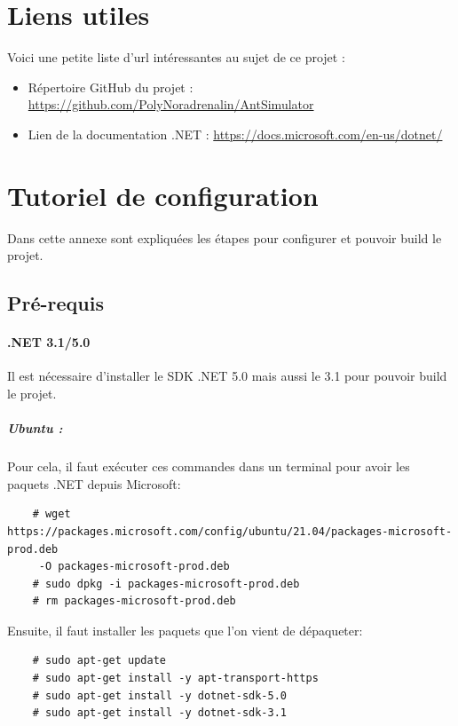 \documentclass{EPUProjetDi}
\begin{document}
\chapter{Liens utiles}
Voici une petite liste d'url intéressantes au sujet de ce projet :

\begin{itemize}
\item {Répertoire GitHub du projet : \url{https://github.com/PolyNoradrenalin/AntSimulator} }
\item {Lien de la documentation .NET : \url{https://docs.microsoft.com/en-us/dotnet/}}
\end{itemize}


\chapter{Tutoriel de configuration}
Dans cette annexe sont expliquées les étapes pour configurer et pouvoir build le projet.

\section*{Pré-requis}
\subsubsection*{.NET 3.1/5.0}
Il est nécessaire d'installer le SDK .NET 5.0 mais aussi le 3.1 pour pouvoir build le projet.

\paragraph{Ubuntu :}

\small
Pour cela, il faut exécuter ces commandes dans un terminal pour avoir les paquets .NET depuis Microsoft:
\begin{verbatim}
    # wget https://packages.microsoft.com/config/ubuntu/21.04/packages-microsoft-prod.deb 
     -O packages-microsoft-prod.deb
    # sudo dpkg -i packages-microsoft-prod.deb
    # rm packages-microsoft-prod.deb
\end{verbatim}
\normalsize

Ensuite, il faut installer les paquets que l'on vient de dépaqueter:

\begin{verbatim}
    # sudo apt-get update
    # sudo apt-get install -y apt-transport-https
    # sudo apt-get install -y dotnet-sdk-5.0
    # sudo apt-get install -y dotnet-sdk-3.1
\end{verbatim}
\end{document}
